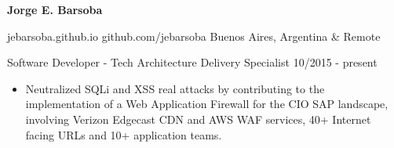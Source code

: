 \documentclass[11pt]{article} %
\begin{document}
\centerline{{\Huge \bf Jorge E. Barsoba}}

\bigskip

        {jebarsoba.github.io}
        {github.com/jebarsoba}
        {Buenos Aires, Argentina \& Remote}


\begin{description}
\squish
{}
           {Software Developer - Tech Architecture Delivery Specialist}
           {10/2015 - present}

\begin{itemize}
\item Neutralized SQLi and XSS real attacks by contributing to the implementation of a Web Application Firewall for the CIO SAP landscape, involving Verizon Edgecast CDN and AWS WAF services, 40+ Internet facing URLs and 10+ application teams.
\end{itemize}

\end{description}
\end{document}
